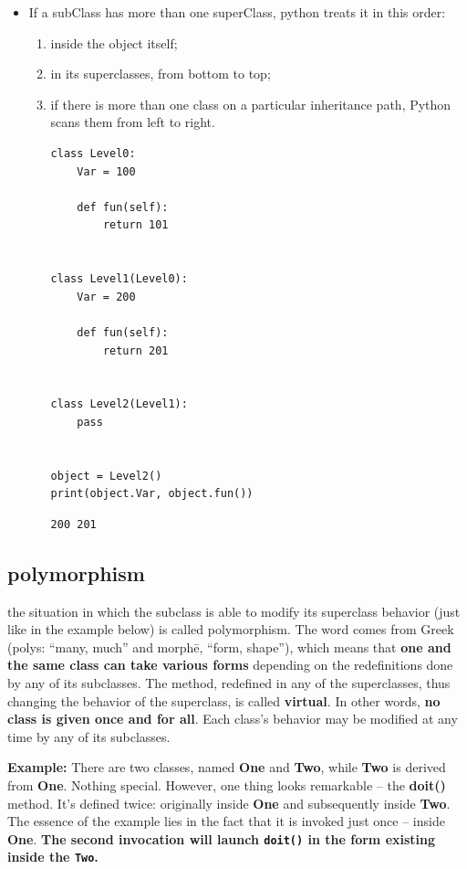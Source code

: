 \documentclass[11pt]{article}
\begin{document}
\begin{itemize}
\item If a subClass has more than one superClass, python treats it in this
order:

\begin{enumerate}
\item inside the object itself;
\item in its superclasses, from bottom to top;
\item if there is more than one class on a particular inheritance path,
Python scans them from left to right.

\begin{verbatim}
class Level0:
	Var = 100

	def fun(self):
		return 101


class Level1(Level0):
	Var = 200

	def fun(self):
		return 201


class Level2(Level1):
	pass


object = Level2()
print(object.Var, object.fun())

\end{verbatim}

\begin{verbatim}
200 201
\end{verbatim}
\end{enumerate}
\end{itemize}
\subsection{polymorphism}
\label{sec:orgec79e9c}

the situation in which the subclass is able to modify its superclass
behavior (just like in the example below) is called polymorphism. The
word comes from Greek (polys: “many, much” and morphē, “form, shape”),
which means that \textbf{one and the same class can take various forms}
depending on the redefinitions done by any of its subclasses. The
method, redefined in any of the superclasses, thus changing the
behavior of the superclass, is called \textbf{virtual}. In other words, \textbf{no}
\textbf{class is given once and for all}. Each class’s behavior may be modified
at any time by any of its subclasses.


 \textbf{Example:} There are two classes, named \textbf{One} and \textbf{Two}, while \textbf{Two}
is derived from \textbf{One}. Nothing special. However, one thing looks
remarkable – the \textbf{doit()} method. It’s defined twice: originally
inside \textbf{One} and subsequently inside \textbf{Two}. The essence of the example
lies in the fact that it is invoked just once – inside \textbf{One}.
\textbf{The second invocation will launch \texttt{doit()} in the form existing inside the \texttt{Two}.}
\end{document}
